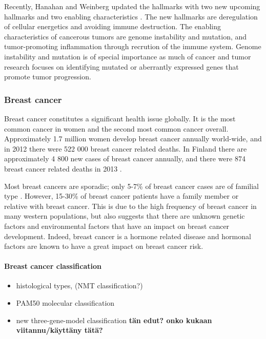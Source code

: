 Recently, Hanahan and Weinberg updated the hallmarks with two new upcoming
hallmarks and two enabling characteristics \citep{Hanahan2011}. The new
hallmarks are deregulation of cellular energetics and avoiding immune
destruction. The enabling characteristics of cancerous tumors are genome
instability and mutation, and tumor-promoting inflammation through recrution
of the immune system. Genome instability and mutation is of special importance
as much of cancer and tumor research focuses  on identifying mutated or
aberrantly expressed genes that promote tumor progression.



\subsubsection{Breast cancer}\label{breast-cancer}

Breast cancer constitutes a significant health issue globally. It is the most
common cancer in women and the second most common cancer overall.
Approximately 1.7 million women develop breast cancer annually world-wide, and
in 2012 there were 522 000 breast cancer related deaths.
\citep{Ferlay2015} In Finland there are approximately 4 800 new cases of
breast cancer annually, and there were 874 breast cancer related deaths in
2013 \citep{Syoparekisteri}.

Most breast cancers are sporadic; only 5-7\% of breast cancer cases are of
familial type \citep{Melchor2013}. However, 15-30\% of breast cancer patients
have a family member or relative with breast cancer. This is due to the high
frequency of breast cancer in many western populations, but also suggests that
there are unknown genetic factors and environmental factors that have an
impact on breast cancer development.  Indeed, breast cancer is a hormone
related disease and hormonal factors are known to have a great impact on
breast cancer risk.


\paragraph{Breast cancer classification}\label{breast-cancer-classification}

\begin{itemize}
\item
  histological types, (NMT classification?)
\item
  PAM50 molecular classification
\item
  new three-gene-model classification \textbf{tän edut? onko kukaan viitannu/käyttäny tätä?}
\end{itemize}










